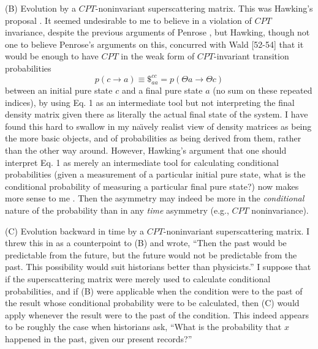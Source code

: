 \documentclass[12pt]{article}
\begin{document}
     (B) Evolution by a $CPT$-noninvariant superscattering matrix.
This was
Hawking's proposal \cite{Haw76}.  It seemed undesirable to me to
believe in a
violation of $CPT$ invariance, despite the previous arguments of
Penrose
\cite{Pen79}, but Hawking, though not one to believe Penrose's
arguments on
this, concurred \cite{Haw80pri} with Wald [52-54] that it
would be enough to have $CPT$ in the weak form of $CPT$-invariant
transition
probabilities
     	\begin{equation}
	p(c\rightarrow a)\equiv\$_{aa}^{cc}=p(\Theta
a\rightarrow\Theta c)
	\end{equation}
between an initial pure state $c$ and a final pure state $a$
(no sum on these repeated indices), by using Eq. 1 as
an intermediate tool but not interpreting the final density matrix
given there
as literally the actual final state of the system.  I have found this
hard to
swallow in my na\"{\i}vely realist view of density matrices as being
the more
basic objects, and of probabilities as being derived from them,
rather than the
other way around.  However, Hawking's argument \cite{Haw82}  that one
should interpret Eq. 1 as merely an intermediate
tool for calculating conditional probabilities (given a measurement
of a
particular initial pure state, what is the conditional probability of
measuring
a particular final pure state?) now makes more sense to me
\cite{Pag93notime}.  Then the asymmetry may indeed be more in the
{\it
conditional} nature of the probability than in any {\it time}
asymmetry (e.g.,
$CPT$ noninvariance).

     (C) Evolution backward in time by a $CPT$-noninvariant
superscattering
matrix.  I threw this in as a counterpoint to (B) and wrote, ``Then
the past
would be predictable from the future, but the future would not be
predictable
from the past.  This possibility would suit historians better than
physicists.''
 I suppose that if the superscattering matrix were merely used to
calculate
conditional probabilities, and if (B) were applicable when the
condition were
to the past of the result whose conditional probability were to be
calculated,
then (C) would apply whenever the result were to the past of the
condition.
This indeed appears to be roughly the case when historians ask,
``What is the
probability that $x$ happened in the past, given our present
records?''
\end{document}

